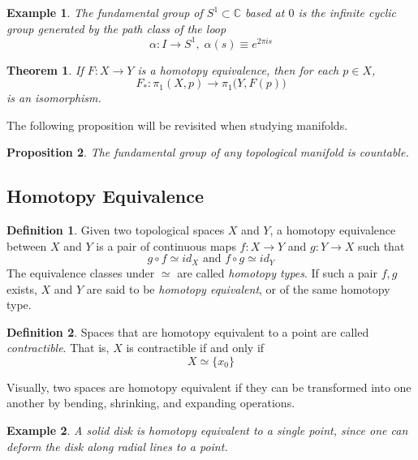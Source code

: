 \documentclass{article}
\newtheorem{theorem}{Theorem}[section]
\newtheorem{proposition}[theorem]{Proposition}
\newtheorem{example}{Example}[section]
\theoremstyle{remark}
\theoremstyle{definition}
\newtheorem{definition}{Definition}[section]
\begin{document}
  \begin{example}
  The fundamental group of $S^1 \subset \mathbb{C}$ based at $0$ is the infinite cyclic group generated by the path class of the loop
  \[\alpha: I \longrightarrow S^1, \; \alpha(s) \equiv e^{2 \pi i s}\]
  \end{example}

  \begin{theorem}
  If $F: X \longrightarrow Y$ is a homotopy equivalence, then for each $p \in X$, 
  \[F_* : \pi_1 (X, p) \longrightarrow \pi_1 \big( Y, F(p) \big)\]
  is an isomorphism. 
  \end{theorem}

  The following proposition will be revisited when studying manifolds. 

  \begin{proposition}
  The fundamental group of any topological manifold is countable. 
  \end{proposition}

  \subsection{Homotopy Equivalence}

    \begin{definition}
    Given two topological spaces $X$ and $Y$, a homotopy equivalence between $X$ and $Y$ is a pair of continuous maps $f:X \longrightarrow Y$ and $g: Y \longrightarrow X$ such that 
    \[g \circ f \simeq id_X \text{ and } f \circ g \simeq id_Y\]
    The equivalence classes under $\simeq$ are called \textit{homotopy types}. If such a pair $f, g$ exists, $X$ and $Y$ are said to be \textit{homotopy equivalent}, or of the same homotopy type. 
    \end{definition}

    \begin{definition}
    Spaces that are homotopy equivalent to a point are called \textit{contractible}. That is, $X$ is contractible if and only if 
    \[X \simeq \{x_0\}\]
    \end{definition}

    Visually, two spaces are homotopy equivalent if they can be transformed into one another by bending, shrinking, and expanding operations. 

    \begin{example}
    A solid disk is homotopy equivalent to a single point, since one can deform the disk along radial lines to a point. 
    \end{example}
\end{document}
